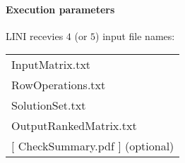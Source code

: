 \documentclass{article}
\begin{document}
\paragraph{Execution parameters}
LINI recevies $4$ (or $5$) input file names:
\begin{table}[h]
\centering
\begin{tabular}{ l }
  InputMatrix.txt       \\
  RowOperations.txt  \\
  SolutionSet.txt    \\
  OutputRankedMatrix.txt   \\
  $[$  CheckSummary.pdf $]$ (optional) \\
\end{tabular}
\end{table}
\end{document}
